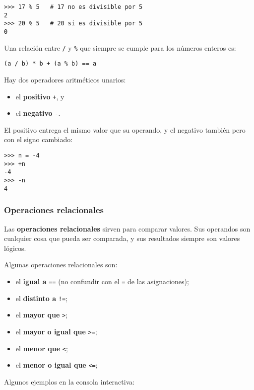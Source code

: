 \begin{lstlisting}
>>> 17 % 5   # 17 no es divisible por 5
2
>>> 20 % 5   # 20 si es divisible por 5
0
\end{lstlisting}

Una relación entre \lstinline!/! y \lstinline!%! que siempre se cumple
para los números enteros es:

\begin{lstlisting}
(a / b) * b + (a % b) == a
\end{lstlisting}

Hay dos operadores aritméticos unarios:

\begin{itemize}
\item
  el \textbf{positivo} \lstinline!+!, y
\item
  el \textbf{negativo} \lstinline!-!.
\end{itemize}

El positivo entrega el mismo valor que su operando, y el negativo
también pero con el signo cambiado:

\begin{lstlisting}
>>> n = -4
>>> +n
-4
>>> -n
4
\end{lstlisting}

\subsubsection{Operaciones relacionales}

Las \textbf{operaciones relacionales} sirven para comparar valores. Sus
operandos son cualquier cosa que pueda ser comparada, y sus resultados
siempre son valores lógicos.

Algunas operaciones relacionales son:

\begin{itemize}
\item
  el \textbf{igual a} \lstinline!==! (no confundir con el \lstinline!=!
  de las asignaciones);
\item
  el \textbf{distinto a} \lstinline"!=";
\item
  el \textbf{mayor que} \lstinline!>!;
\item
  el \textbf{mayor o igual que} \lstinline!>=!;
\item
  el \textbf{menor que} \lstinline!<!;
\item
  el \textbf{menor o igual que} \lstinline!<=!;
\end{itemize}

Algunos ejemplos en la consola interactiva:

